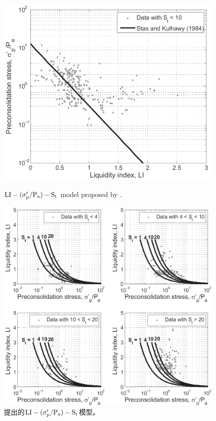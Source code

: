 \begin{figure}[!p]
    \centering
    \begin{minipage}[t]{0.48\textwidth}
        \centering
        \includegraphics[width=\textwidth]{figures/figure-6.png}
        \caption{$\rm{LI}-(\sigma_p'/P_a)-S_t$ model proposed by \citet{Stas1984}.}
        \vspace{-5pt}
        \addtocounter{figure}{-1}
        \renewcommand{\figurename}{图}
        \caption{\citet{Stas1984}提出的$\rm{LI}-(\sigma_p'/P_a)-S_t$模型。}
        \renewcommand{\figurename}{Figure}
    \end{minipage}
    \begin{minipage}[t]{0.48\textwidth}
        \centering
        \includegraphics[width=\textwidth]{figures/figure-7.png}

\end{minipage}
\end{figure}
